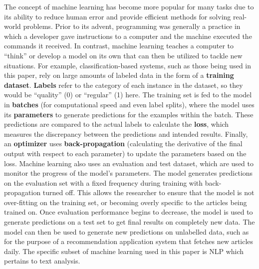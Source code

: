 The concept of machine learning has become more popular for many tasks due to its ability to reduce human error and provide efficient methods for solving real-world problems. Prior to its advent, programming was generally a practice in which a developer gave instructions to a computer and the machine executed the commands it received. In contrast, machine learning teaches a computer to “think” or develop a model on its own that can then be utilized to tackle new situations. For example, classification-based systems, such as those being used in this paper, rely on large amounts of labeled data in the form of a \textbf{training dataset}. \textbf{Labels} refer to the category of each instance in the dataset, so they would be “quality” (0) or “regular” (1) here. The training set is fed to the model in \textbf{batches} (for computational speed and even label splits), where the model uses its \textbf{parameters} to generate predictions for the examples within the batch. These predictions are compared to the actual labels to calculate the \textbf{loss}, which measures the discrepancy between the predictions and intended results. Finally, an \textbf{optimizer} uses \textbf{back-propagation} (calculating the derivative of the final output with respect to each parameter) to update the parameters based on the loss. Machine learning also uses an evaluation and test dataset, which are used to monitor the progress of the model’s parameters. The model generates predictions on the evaluation set with a fixed frequency during training with back-propagation turned off. This allows the researcher to ensure that the model is not over-fitting on the training set, or becoming overly specific to the articles being trained on. Once evaluation performance begins to decrease, the model is used to generate predictions on a test set to get final results on completely new data. The model can then be used to generate new predictions on unlabelled data, such as for the purpose of a recommendation application system that fetches new articles daily. The specific subset of machine learning used in this paper is \gls{NLP} which pertains to text analysis.